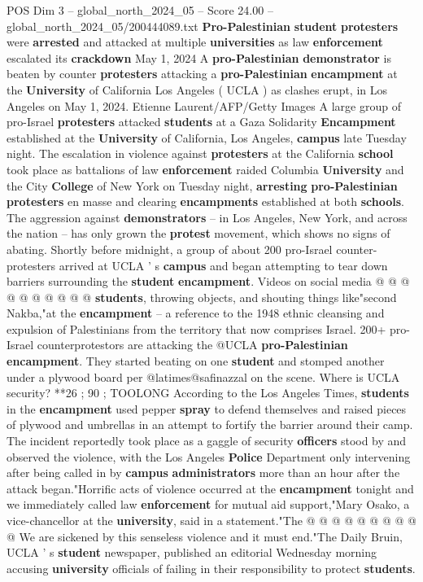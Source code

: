\begin{textsample}{POS Dim 3 – global\_north\_2024\_05 – Score 24.00 – global\_north\_2024\_05/200444089.txt}  \label{ex:f3_pos_019}
\textbf{Pro-Palestinian} \textbf{student} \textbf{protesters} were \textbf{arrested} and attacked at multiple \textbf{universities} as law \textbf{enforcement} escalated its \textbf{crackdown} May 1, 2024 A \textbf{pro-Palestinian} \textbf{demonstrator} is beaten by counter \textbf{protesters} attacking a \textbf{pro-Palestinian} \textbf{encampment} at the \textbf{University} of California Los Angeles ( UCLA ) as clashes erupt, in Los Angeles on May 1, 2024.
Etienne Laurent/AFP/Getty Images A large group of pro-Israel \textbf{protesters} attacked \textbf{students} at a Gaza Solidarity \textbf{Encampment} established at the \textbf{University} of California, Los Angeles, \textbf{campus} late Tuesday night.
The escalation in violence against \textbf{protesters} at the California \textbf{school} took place as battalions of law \textbf{enforcement} raided Columbia \textbf{University} and the City \textbf{College} of New York on Tuesday night, \textbf{arresting} \textbf{pro-Palestinian} \textbf{protesters} en masse and clearing \textbf{encampments} established at both \textbf{schools}.
The aggression against \textbf{demonstrators} -- in Los Angeles, New York, and across the nation -- has only grown the \textbf{protest} movement, which shows no signs of abating.
Shortly before midnight, a group of about 200 pro-Israel counter-protesters arrived at UCLA ' s \textbf{campus} and began attempting to tear down barriers surrounding the \textbf{student} \textbf{encampment}.
Videos on social media @ @ @ @ @ @ @ @ @ @ \textbf{students}, throwing objects, and shouting things like"second Nakba,"at the \textbf{encampment} -- a reference to the 1948 ethnic cleansing and expulsion of Palestinians from the territory that now comprises Israel. 200+ pro-Israel counterprotestors are attacking the @UCLA \textbf{pro-Palestinian} \textbf{encampment}.
They started beating on one \textbf{student} and stomped another under a plywood board per @latimes@safinazzal on the scene.
Where is UCLA security? **26 ; 90 ; TOOLONG According to the Los Angeles Times, \textbf{students} in the \textbf{encampment} used pepper \textbf{spray} to defend themselves and raised pieces of plywood and umbrellas in an attempt to fortify the barrier around their camp.
The incident reportedly took place as a gaggle of security \textbf{officers} stood by and observed the violence, with the Los Angeles \textbf{Police} Department only intervening after being called in by \textbf{campus} \textbf{administrators} more than an hour after the attack began."Horrific acts of violence occurred at the \textbf{encampment} tonight and we immediately called law \textbf{enforcement} for mutual aid support,"Mary Osako, a vice-chancellor at the \textbf{university}, said in a statement."The @ @ @ @ @ @ @ @ @ @ We are sickened by this senseless violence and it must end."The Daily Bruin, UCLA ' s \textbf{student} newspaper, published an editorial Wednesday morning accusing \textbf{university} officials of failing in their responsibility to protect \textbf{students}.

\end{textsample}
